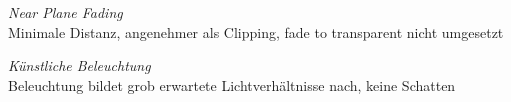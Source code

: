 \textit{Near Plane Fading}\\
Minimale Distanz, angenehmer als Clipping, fade to transparent nicht umgesetzt\\

\textit{Künstliche Beleuchtung}\\
Beleuchtung bildet grob erwartete Lichtverhältnisse nach, keine Schatten\\

